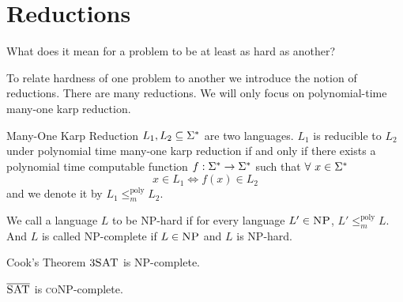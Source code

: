 \section{Reductions}
\begin{question}{}{}
    What does it mean for a problem to be at least as hard as another? 
\end{question}
To relate hardness of one problem to another we introduce the notion of reductions. There are many reductions. We will only focus on polynomial-time many-one karp reduction. 
\begin{Definition}{Many-One Karp Reduction}{}
$L_1,L_2\subseteq\Sigma^*$ are two languages. $L_1$ is reducible to $L_2$ under polynomial time many-one karp reduction if and only if there exists a polynomial time computable  function $f:\Sigma^*\to\Sigma^*$ such that $\forall\ x\in \Sigma^*$ $$x\in L_1\iff f(x)\in L_2$$ and we denote it by $L_1\leq_{m}^{\text{poly}} L_2$. 
\end{Definition}
We call a language $L$ to be \textsc{NP}-hard if for every language $L'\in\textsc{NP}$, $L'\leq_{m}^{\text{poly}}L$. And $L$ is called \textsc{NP}-complete if $L\in\textsc{NP}$ and $L$ is \textsc{NP}-hard. 
\begin{Theorem}{Cook's Theorem}{}
$3\textsc{SAT}$ is \textsc{NP}-complete.
\end{Theorem}
\begin{corolary}{}{}
    $\overline{\textsc{SAT}}$ is \textsc{coNP}-complete. 
\end{corolary}
